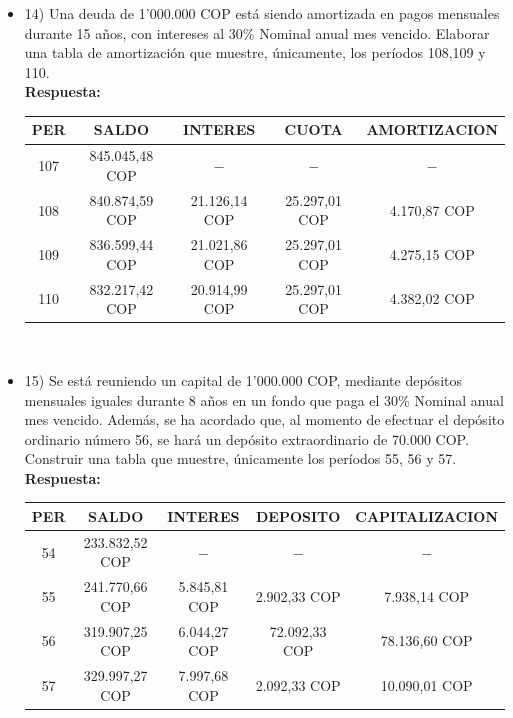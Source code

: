 \begin{itemize}
 \item 14)	 Una deuda de 1'000.000 COP está siendo amortizada en pagos mensuales durante 15 años, con intereses al 30\% Nominal anual mes vencido. Elaborar una tabla de amortización que muestre, únicamente, los períodos 108,109 y 110.\\
       \textbf{Respuesta:}
       \begin{center}
          \begin{tabular}{| c | c | c | c | c |}
    \hline
    \textbf{PER} & \textbf{SALDO} & \textbf{INTERES} & \textbf{CUOTA} & \textbf{AMORTIZACION}  \\ \hline
    107 & 845.045,48 COP & $-$ & $-$ &  $-$  \\ \hline
    108 & 840.874,59 COP & 21.126,14 COP & 25.297,01 COP &  4.170,87 COP \\ \hline
    109 & 836.599,44 COP & 21.021,86 COP & 25.297,01 COP &  4.275,15 COP \\ \hline
    110 & 832.217,42 COP & 20.914,99 COP & 25.297,01 COP & 4.382,02 COP \\ \hline

    \end{tabular}\\
       \end{center}
       \medskip

 \item 15)	 Se está reuniendo un capital de 1'000.000 COP, mediante depósitos mensuales iguales durante 8 años en un fondo que paga el 30\% Nominal anual mes vencido. Además, se ha acordado que, al momento de efectuar el depósito ordinario número 56, se hará un depósito extraordinario de 70.000 COP. Construir una tabla que muestre, únicamente los períodos 55, 56 y 57.\\
       \textbf{Respuesta:}
       \begin{center}
    \begin{tabular}{| c | c | c | c | c |}
    \hline
    \textbf{PER} & \textbf{SALDO} & \textbf{INTERES} & \textbf{DEPOSITO} & \textbf{CAPITALIZACION}  \\ \hline
    54 & 233.832,52 COP & $-$ & $-$ &  $-$  \\ \hline
    55 & 241.770,66 COP & 5.845,81 COP & 2.902,33 COP &  7.938,14 COP \\ \hline
    56 & 319.907,25 COP & 6.044,27 COP & 72.092,33 COP &  78.136,60 COP  \\ \hline
    57 & 329.997,27 COP & 7.997,68 COP & 2.092,33 COP & 10.090,01 COP \\ \hline


\end{tabular}
\end{center}
\end{itemize}

